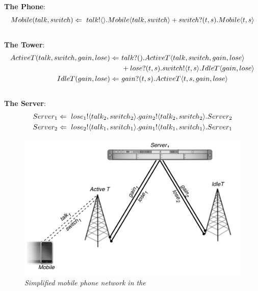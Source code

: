 \documentclass[12pt,twoside]{reedthesis}
\begin{document}
	  \pagestyle{empty}
		\null\vfil
		\centering \textbf{The Phone}:
		\[
			Mobile(talk, switch) \Leftarrow\  {talk}!\langle{}\rangle. Mobile\langle talk,switch\rangle + {switch}?({t,s}). Mobile\langle t,s\rangle
		\]\\[20pt]
		
		\centering \textbf{The Tower}:
		\begin{align*}
			ActiveT(talk,switch,gain,lose) \Leftarrow\  & {talk}?({}).ActiveT\langle talk,switch,gain,lose\rangle \\  
			 & +{lose}?({t,s}).{switch}!\langle{t,s}\rangle.IdleT\langle gain, lose\rangle\\
			IdleT(gain,lose) \Leftarrow\  & {gain}?({t,s}).ActiveT\langle t,s,gain,lose\rangle\\
		\end{align*}\\[20pt]
		
		\centering \textbf{The Server}:
		\begin{align*}
			Server_1 \Leftarrow\  {lose_1}!\langle{talk_2,switch_2}\rangle. {gain_2}!\langle{talk_2,switch_2}\rangle. Server_2\\
			Server_2 \Leftarrow\  {lose_2}!\langle{talk_1,switch_1}\rangle. {gain_1}!\langle{talk_1,switch_1}\rangle. Server_1
		\end{align*}
		\newpage
		\null\vfil
		\begin{figure}[H]
		\centering
		\includegraphics[scale=0.7]{figures/cell_network_pi.pdf} %
		\caption{\emph{Simplified mobile phone network in the \picalc}}
		\label{fig_cell_network_pi}
		\end{figure}
		\newpage
		\null\vfil
	  		
\end{document}
